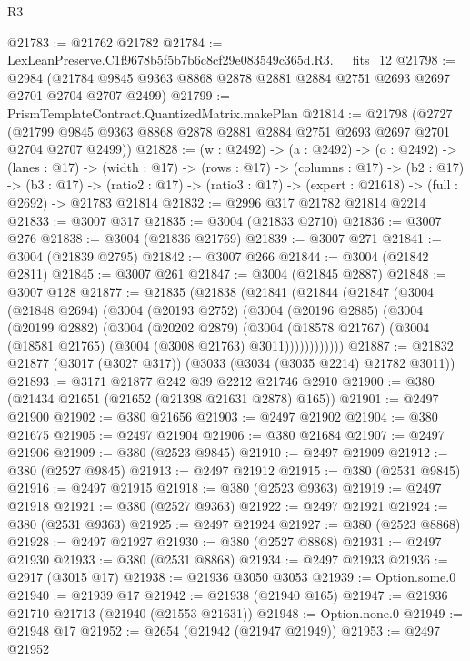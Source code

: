 \begin{lexlean}{R3}
\begin{coremodule}
@21783 := @21762 @21782
@21784 := LexLeanPreserve.C1f9678b5f5b7b6c8cf29e083549c365d.R3.__fits_12
@21798 := @2984
    (@21784 @9845 @9363 @8868 @2878 @2881 @2884 @2751 @2693 @2697 @2701 @2704 @2707 @2499)
@21799 := PrismTemplateContract.QuantizedMatrix.makePlan
@21814 := @21798
    (@2727 (@21799 @9845 @9363 @8868 @2878 @2881 @2884 @2751 @2693 @2697 @2701 @2704 @2707 @2499))
@21828 := (w : @2492) ->
  (a : @2492) ->
  (o : @2492) ->
  (lanes : @17) ->
  (width : @17) ->
  (rows : @17) ->
  (columns : @17) ->
  (b2 : @17) ->
  (b3 : @17) ->
  (ratio2 : @17) -> (ratio3 : @17) -> (expert : @21618) -> (full : @2692) -> @21783 @21814
@21832 := @2996 @317 @21782 @21814 @2214
@21833 := @3007 @317
@21835 := @3004 (@21833 @2710)
@21836 := @3007 @276
@21838 := @3004 (@21836 @21769)
@21839 := @3007 @271
@21841 := @3004 (@21839 @2795)
@21842 := @3007 @266
@21844 := @3004 (@21842 @2811)
@21845 := @3007 @261
@21847 := @3004 (@21845 @2887)
@21848 := @3007 @128
@21877 := @21835
    (@21838
      (@21841
        (@21844
          (@21847
            (@3004
              (@21848 @2694)
              (@3004
                (@20193 @2752)
                (@3004
                  (@20196 @2885)
                  (@3004
                    (@20199 @2882)
                    (@3004
                      (@20202 @2879)
                      (@3004
                        (@18578 @21767)
                        (@3004 (@18581 @21765) (@3004 (@3008 @21763) @3011))))))))))))
@21887 := @21832 @21877 (@3017 (@3027 @317)) (@3033 (@3034 (@3035 @2214) @21782 @3011))
@21893 := @3171 @21877 @242 @39 @2212 @21746 @2910
@21900 := @380 (@21434 @21651 (@21652 (@21398 @21631 @2878) @165))
@21901 := @2497 @21900
@21902 := @380 @21656
@21903 := @2497 @21902
@21904 := @380 @21675
@21905 := @2497 @21904
@21906 := @380 @21684
@21907 := @2497 @21906
@21909 := @380 (@2523 @9845)
@21910 := @2497 @21909
@21912 := @380 (@2527 @9845)
@21913 := @2497 @21912
@21915 := @380 (@2531 @9845)
@21916 := @2497 @21915
@21918 := @380 (@2523 @9363)
@21919 := @2497 @21918
@21921 := @380 (@2527 @9363)
@21922 := @2497 @21921
@21924 := @380 (@2531 @9363)
@21925 := @2497 @21924
@21927 := @380 (@2523 @8868)
@21928 := @2497 @21927
@21930 := @380 (@2527 @8868)
@21931 := @2497 @21930
@21933 := @380 (@2531 @8868)
@21934 := @2497 @21933
@21936 := @2917 (@3015 @17)
@21938 := @21936 @3050 @3053
@21939 := Option.some.{0}
@21940 := @21939 @17
@21942 := @21938 (@21940 @165)
@21947 := @21936 @21710 @21713 (@21940 (@21553 @21631))
@21948 := Option.none.{0}
@21949 := @21948 @17
@21952 := @2654 (@21942 (@21947 @21949))
@21953 := @2497 @21952

\end{coremodule}
\end{lexlean}
